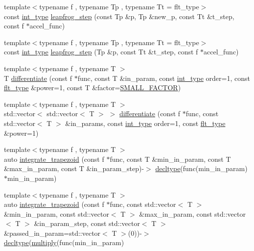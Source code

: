 \begin{DoxyCompactItemize}
\item 
{\footnotesize template$<$typename f , typename Tp , typename Tt  = flt\-\_\-type$>$ }\\const \hyperlink{lib_2IceBRG__main_2common_8h_ac4de9d9335536ac22821171deec8d39e}{int\-\_\-type} \hyperlink{namespaceIceBRG_a67327eb98e2cdb7f17d7c84bf9f200da}{leapfrog\-\_\-step} (const Tp \&p, Tp \&new\-\_\-p, const Tt \&t\-\_\-step, const f $\ast$accel\-\_\-func)
\item 
{\footnotesize template$<$typename f , typename Tp , typename Tt  = flt\-\_\-type$>$ }\\const \hyperlink{lib_2IceBRG__main_2common_8h_ac4de9d9335536ac22821171deec8d39e}{int\-\_\-type} \hyperlink{namespaceIceBRG_aa9d2ab9f41c447558b2db6076dfcf3c1}{leapfrog\-\_\-step} (Tp \&p, const Tt \&t\-\_\-step, const f $\ast$accel\-\_\-func)
\item 
{\footnotesize template$<$typename f , typename T $>$ }\\T \hyperlink{namespaceIceBRG_a2e5e6245a68a169006582de78ed4760d}{differentiate} (const f $\ast$func, const T \&in\-\_\-param, const \hyperlink{lib_2IceBRG__main_2common_8h_ac4de9d9335536ac22821171deec8d39e}{int\-\_\-type} order=1, const \hyperlink{lib_2IceBRG__main_2common_8h_ad0f130a56eeb944d9ef2692ee881ecc4}{flt\-\_\-type} \&power=1, const T \&factor=\hyperlink{lib_2IceBRG__main_2common_8h_a730d3bec6e12c0566140efd6b77e3d7d}{S\-M\-A\-L\-L\-\_\-\-F\-A\-C\-T\-O\-R})
\item 
{\footnotesize template$<$typename f , typename T $>$ }\\std\-::vector$<$ std\-::vector$<$ T $>$ $>$ \hyperlink{namespaceIceBRG_a066b3f43de151d16ff1ded1cabd4dae6}{differentiate} (const f $\ast$func, const std\-::vector$<$ T $>$ \&in\-\_\-params, const \hyperlink{lib_2IceBRG__main_2common_8h_ac4de9d9335536ac22821171deec8d39e}{int\-\_\-type} order=1, const \hyperlink{lib_2IceBRG__main_2common_8h_ad0f130a56eeb944d9ef2692ee881ecc4}{flt\-\_\-type} \&power=1)
\item 
{\footnotesize template$<$typename f , typename T $>$ }\\auto \hyperlink{namespaceIceBRG_af83a968326dc509b1c0a4cec8d8445e5}{integrate\-\_\-trapezoid} (const f $\ast$func, const T \&min\-\_\-in\-\_\-param, const T \&max\-\_\-in\-\_\-param, const T \&in\-\_\-param\-\_\-step)-\/$>$ \hyperlink{namespaceIceBRG_a528e5024ecab03049320529180ae84a8}{decltype}(func(min\-\_\-in\-\_\-param)$\ast$min\-\_\-in\-\_\-param)
\item 
{\footnotesize template$<$typename f , typename T $>$ }\\auto \hyperlink{namespaceIceBRG_aba8ba8fad2576794a6d64e7dd4f7182b}{integrate\-\_\-trapezoid} (const f $\ast$func, const std\-::vector$<$ T $>$ \&min\-\_\-in\-\_\-param, const std\-::vector$<$ T $>$ \&max\-\_\-in\-\_\-param, const std\-::vector$<$ T $>$ \&in\-\_\-param\-\_\-step, const std\-::vector$<$ T $>$ \&passed\-\_\-in\-\_\-param=std\-::vector$<$ T $>$(0))-\/$>$ \hyperlink{namespaceIceBRG_a528e5024ecab03049320529180ae84a8}{decltype}(\hyperlink{namespaceIceBRG_ab535c998baac3ffc8412fdbae750b7d1}{multiply}(func(min\-\_\-in\-\_\-param)

\end{DoxyCompactItemize}
